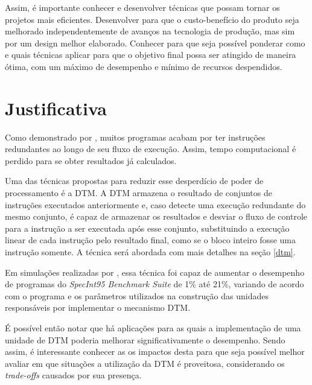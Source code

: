 Assim, é importante conhecer e desenvolver técnicas que possam tornar os projetos mais eficientes. Desenvolver para que o custo-benefício do produto seja melhorado independentemente de avanços na tecnologia de produção, mas sim por um design melhor elaborado. Conhecer para que seja possível ponderar como e quais técnicas aplicar para que o objetivo final possa ser atingido de maneira ótima, com um máximo de desempenho e mínimo de recursos despendidos.



\section{Justificativa}
\label{Introducao:Justificativa} %


Como demonstrado por , muitos programas acabam por ter instruções redundantes ao longo de seu fluxo de execução. Assim, tempo computacional é perdido para se obter resultados já calculados.

Uma das técnicas propostas para reduzir esse desperdício de poder de processamento é a DTM. A DTM armazena o resultado de conjuntos de instruções executados anteriormente e, caso detecte uma execução redundante do mesmo conjunto, é capaz de armazenar os resultados e desviar o fluxo de controle para a instrução a ser executada após esse conjunto, substituindo a execução linear de cada instrução pelo resultado final, como se o bloco inteiro fosse uma instrução somente. A técnica será abordada com mais detalhes na seção \ref{dtm}.

Em simulações realizadas por , essa técnica foi capaz de aumentar o desempenho de programas do \textit{SpecInt95 Benchmark Suite} de 1\% até 21\%, variando de acordo com o programa e os parâmetros utilizados na construção das unidades responsáveis por implementar o mecanismo DTM.

É possível então notar que há aplicações para as quais a implementação de uma unidade de DTM poderia melhorar significativamente o desempenho. Sendo assim, é interessante conhecer as os impactos desta para que seja possível melhor avaliar em que situações a utilização da DTM é proveitosa, considerando os \textit{trade-offs} causados por sua presença.

